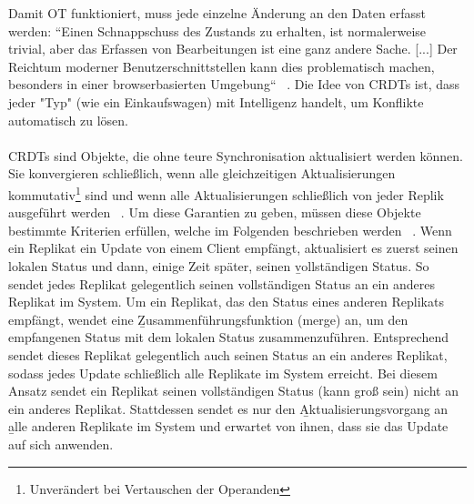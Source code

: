       Damit OT funktioniert, muss jede einzelne Änderung an den Daten erfasst werden: ``Einen Schnappschuss des Zustands zu erhalten, ist normalerweise trivial, aber das Erfassen von Bearbeitungen ist eine ganz andere Sache. [...] Der Reichtum moderner Benutzerschnittstellen kann dies problematisch machen, besonders in einer browserbasierten Umgebung`` ~\cite{diff_sync}.
%
%
  Die Idee von \glspl{CRDT} ist, dass jeder "Typ" (wie ein Einkaufswagen) mit Intelligenz handelt, um Konflikte automatisch zu lösen.\\\\
  CRDTs sind Objekte, die ohne teure Synchronisation aktualisiert werden können. Sie konvergieren schließlich, wenn alle gleichzeitigen Aktualisierungen kommutativ\footnote{Unverändert bei Vertauschen der Operanden} sind und wenn alle Aktualisierungen schließlich von jeder Replik ausgeführt werden ~\cite{crdt_shapiro}.
  Um diese Garantien zu geben, müssen diese Objekte bestimmte Kriterien erfüllen, welche im Folgenden beschrieben werden ~\cite{crdt_shapiro2}.
  Wenn ein Replikat ein Update von einem Client empfängt, aktualisiert es zuerst seinen lokalen Status und dann, einige Zeit später, seinen \b{vollständigen Status}. So sendet jedes Replikat gelegentlich seinen vollständigen Status an ein anderes Replikat im System. Um ein Replikat, das den Status eines anderen Replikats empfängt, wendet eine \b{Zusammenführungsfunktion} (merge) an, um den empfangenen Status mit dem lokalen Status zusammenzuführen. Entsprechend sendet dieses Replikat gelegentlich auch seinen Status an ein anderes Replikat, sodass jedes Update schließlich alle Replikate im System erreicht.
  Bei diesem Ansatz sendet ein Replikat seinen vollständigen Status (kann groß sein) nicht an ein anderes Replikat. Stattdessen sendet es nur den \b{Aktualisierungsvorgang} an \b{alle} anderen Replikate im System und erwartet von ihnen, dass sie das Update auf sich anwenden.\\
